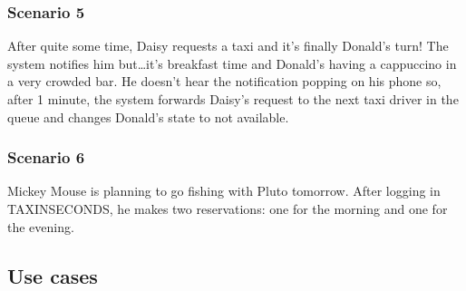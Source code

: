 \documentclass{article}
\begin{document}
\subsubsection{Scenario 5}
After quite some time, Daisy requests a taxi and it's finally Donald's turn! The system notifies him but\ldots it's breakfast time and Donald's having a cappuccino in a very crowded bar. He doesn't hear the notification popping on his phone so, after 1 minute, the system forwards Daisy's request to the next taxi driver in the queue and changes Donald's state to not available.
\subsubsection{Scenario 6}
Mickey Mouse is planning to go fishing with Pluto tomorrow. After logging in TAXINSECONDS, he makes two reservations: one for the morning and one for the evening. %

\subsection{Use cases}
\end{document}
